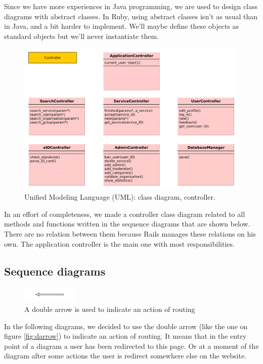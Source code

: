 Since we have more experiences in Java programming, we are used to design class diagrams with abstract classes. In Ruby, using abstract classes isn't as usual than in Java, and a bit harder to implement. We'll maybe define these objects as standard objects but we'll never instantiate them.\\
\begin{figure}[!ht]
	\begin{center}
		\includegraphics[width=.8\textwidth]{UML_Controller.png}
		\caption{Unified Modeling Language (UML): class diagram, controller.}
		\label{fig:uml_controller}
	\end{center}
\end{figure}

In an effort of completeness, we made a controller class diagram related to all methods and functions written in the sequence diagrams that are shown below. There are no relation between them because Rails manages these relations on his own. The application controller is the main one with most responsibilities. 

\subsection{Sequence diagrams}

\begin{figure}[!ht]
	\begin{center}
		\includegraphics[scale=.5]{dubble_arrow.png} %
		\caption{A double arrow is used to indicate an action of routing}
		\label{fig:darrow}
	\end{center}
\end{figure}
In the following diagrams, we decided to use the double arrow (like the one on figure \vref{fig:darrow}) to indicate an action of routing. It means that in the entry point of a diagram a user has been redirected to this page. Or at a moment of the diagram after some actions the user is redirect somewhere else on the website.

